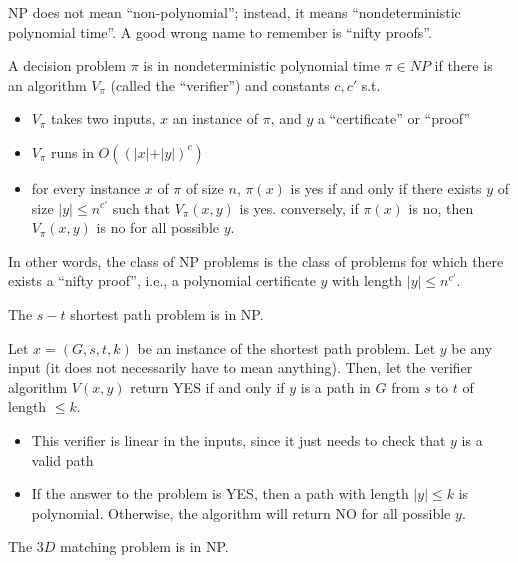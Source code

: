NP does not mean ``non-polynomial''; instead, it means ``nondeterministic polynomial time''. A good wrong name to remember is ``nifty proofs''. 

\begin{definition}

A decision problem $\pi$ is in nondeterministic polynomial time $\pi \in NP$ if there is an algorithm $V_\pi$ (called the ``verifier'') and constants $c,c'$ s.t. 
\begin{itemize}
    \item $V_\pi$ takes two inputs, $x$ an instance of $\pi$, and $y$ a ``certificate'' or ``proof''
    \item $V_\pi$ runs in $O((\vert x\vert + \vert y\vert)^c)$
    \item for every instance $x$ of $\pi$ of size $n$, $\pi(x)$ is yes if and only if there exists $y$ of size $\vert y\vert \leq n^{c'}$ such that $V_{\pi}(x,y)$ is yes. conversely, if $\pi(x)$ is no, then $V_{\pi}(x,y)$ is no for all possible $y$. 
\end{itemize}
\end{definition}

In other words, the class of NP problems is the class of problems for which there exists a ``nifty proof'', i.e., a polynomial certificate $y$ with length $\vert y\vert\leq n^{c'}$. 

\begin{example}
\exlabel

The $s-t$ shortest path problem is in NP. 
\end{example}

Let $x = (G, s, t, k)$ be an instance of the shortest path problem. Let $y$ be any input (it does not necessarily have to mean anything). Then, let the verifier algorithm $V(x, y)$ return YES if and only if $y$ is a path in $G$ from $s$ to $t$ of length $\leq k$.

\begin{itemize}
    \item This verifier is linear in the inputs, since it just needs to check that $y$ is a valid path
    \item If the answer to the problem is YES, then a path with length $\vert y\vert \leq k$ is polynomial. Otherwise, the algorithm will return NO for all possible $y$.
\end{itemize}

\begin{example}
\exlabel

The $3D$ matching problem is in NP. 
\end{example}

